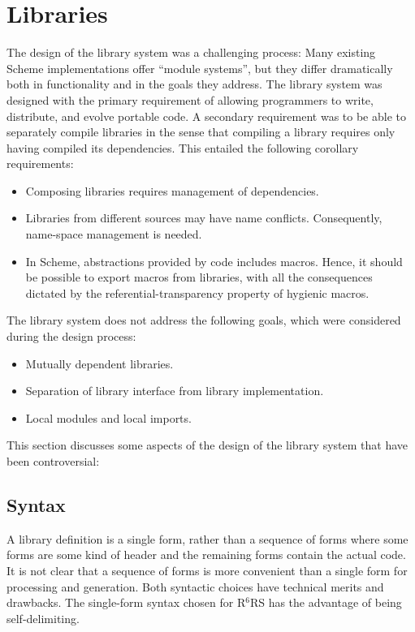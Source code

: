 \documentclass[twoside,twocolumn]{algol60}
\newcommand{\rn}[1]{R$^{#1}$RS}
\begin{document}
\chapter{Libraries}

The design of the library system was a challenging process: Many
existing Scheme implementations offer ``module systems'', but they
differ dramatically both in functionality and in the goals they
address.  The library system was designed with the primary
requirement of allowing programmers to write, distribute, and evolve
portable code.  A secondary requirement was to be able to separately
compile libraries in the sense that compiling a library requires only
having compiled its dependencies.  This entailed the following
corollary requirements:
%
\begin{itemize}
\item Composing libraries requires management of dependencies.
\item Libraries from different sources may have name conflicts.
  Consequently, name-space management is needed.
\item In Scheme, abstractions provided by code includes macros.
  Hence, it should be possible to export macros from libraries, with all
  the consequences dictated by the referential-transparency property
  of hygienic macros.
\end{itemize}
%
The library system does not address the following goals, which were
considered during the design process:
%
\begin{itemize}
\item Mutually dependent libraries.
\item Separation of library interface from library implementation.
\item Local modules and local imports. 
\end{itemize}
%
This section discusses some aspects of the design of the library
system that have been controversial:

\section{Syntax}

A library definition is a single form, rather than a sequence of forms
where some forms are some kind of header and the remaining forms
contain the actual code.
It is not clear that a sequence of forms is more convenient than a
single form for processing and generation. Both syntactic choices have
technical merits and drawbacks. The single-form syntax chosen for
\rn{6} has the advantage of being self-delimiting.
\end{document}
